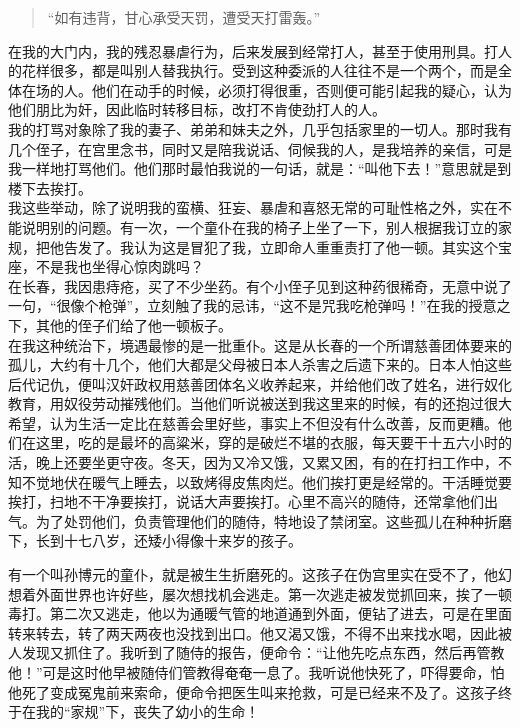 \begin{quote}
	“如有违背，甘心承受天罚，遭受天打雷轰。”\\
\end{quote}

在我的大门内，我的残忍暴虐行为，后来发展到经常打人，甚至于使用刑具。打人的花样很多，都是叫别人替我执行。受到这种委派的人往往不是一个两个，而是全体在场的人。他们在动手的时候，必须打得很重，否则便可能引起我的疑心，认为他们朋比为奸，因此临时转移目标，改打不肯使劲打人的人。\\

我的打骂对象除了我的妻子、弟弟和妹夫之外，几乎包括家里的一切人。那时我有几个侄子，在宫里念书，同时又是陪我说话、伺候我的人，是我培养的亲信，可是我一样地打骂他们。他们那时最怕我说的一句话，就是：“叫他下去！”意思就是到楼下去挨打。\\

我这些举动，除了说明我的蛮横、狂妄、暴虐和喜怒无常的可耻性格之外，实在不能说明别的问题。有一次，一个童仆在我的椅子上坐了一下，别人根据我订立的家规，把他告发了。我认为这是冒犯了我，立即命人重重责打了他一顿。其实这个宝座，不是我也坐得心惊肉跳吗？\\

在长春，我因患痔疮，买了不少坐药。有个小侄子见到这种药很稀奇，无意中说了一句，“很像个枪弹”，立刻触了我的忌讳，“这不是咒我吃枪弹吗！”在我的授意之下，其他的侄子们给了他一顿板子。\\

在我这种统治下，境遇最惨的是一批重仆。这是从长春的一个所谓慈善团体要来的孤儿，大约有十几个，他们大都是父母被日本人杀害之后遗下来的。日本人怕这些后代记仇，便叫汉奸政权用慈善团体名义收养起来，并给他们改了姓名，进行奴化教育，用奴役劳动摧残他们。当他们听说被送到我这里来的时候，有的还抱过很大希望，认为生活一定比在慈善会里好些，事实上不但没有什么改善，反而更糟。他们在这里，吃的是最坏的高粱米，穿的是破烂不堪的衣服，每天要干十五六小时的活，晚上还要坐更守夜。冬天，因为又冷又饿，又累又困，有的在打扫工作中，不知不觉地伏在暖气上睡去，以致烤得皮焦肉烂。他们挨打更是经常的。干活睡觉要挨打，扫地不干净要挨打，说话大声要挨打。心里不高兴的随侍，还常拿他们出气。为了处罚他们，负责管理他们的随侍，特地设了禁闭室。这些孤儿在种种折磨下，长到十七八岁，还矮小得像十来岁的孩子。

有一个叫孙博元的童仆，就是被生生折磨死的。这孩子在伪宫里实在受不了，他幻想着外面世界也许好些，屡次想找机会逃走。第一次逃走被发觉抓回来，挨了一顿毒打。第二次又逃走，他以为通暖气管的地道通到外面，便钻了进去，可是在里面转来转去，转了两天两夜也没找到出口。他又渴又饿，不得不出来找水喝，因此被人发现又抓住了。我听到了随侍的报告，便命令：“让他先吃点东西，然后再管教他！”可是这时他早被随侍们管教得奄奄一息了。我听说他快死了，吓得要命，怕他死了变成冤鬼前来索命，便命令把医生叫来抢救，可是已经来不及了。这孩子终于在我的“家规”下，丧失了幼小的生命！\\

